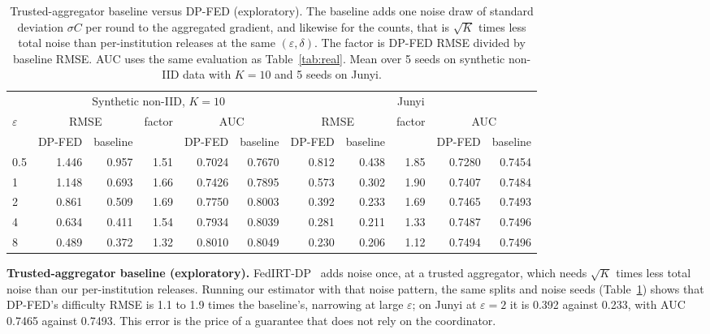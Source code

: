 \documentclass[pdflatex,iicol,sn-mathphys-num]{sn-jnl}
\theoremstyle{thmstyleone}
\newenvironment{widetable}{\begin{table}[t]}{\end{table}}
\newcommand{\ExJunyiFedTwoAuc}{0.7465}
\newcommand{\ExJunyiFedTwoRmse}{0.392}
\newcommand{\ExJunyiSecTwoAuc}{0.7493}
\newcommand{\ExJunyiSecTwoRmse}{0.233}
\newcommand{\ExRatioMax}{1.9}
\newcommand{\ExRatioMin}{1.1}
\newcommand{\ExSeedsJunyi}{5}
\newcommand{\NSeeds}{5}
\begin{document}
\begin{widetable}
\centering
\caption{Trusted-aggregator baseline versus DP-FED (exploratory). The baseline adds one noise draw of standard deviation $\sigma C$ per round to the aggregated gradient, and likewise for the counts, that is $\sqrt{K}$ times less total noise than per-institution releases at the same $(\varepsilon,\delta)$. The factor is DP-FED RMSE divided by baseline RMSE. AUC uses the same evaluation as Table~\ref{tab:real}. Mean over \NSeeds{} seeds on synthetic non-IID data with $K=10$ and \ExSeedsJunyi{} seeds on Junyi.}
\label{tab:fedirtdp}
\footnotesize\setlength{\tabcolsep}{4pt}
\begin{tabular}{l rrr rr rrr rr}
\toprule
& \multicolumn{5}{c}{Synthetic non-IID, $K=10$} & \multicolumn{5}{c}{Junyi} \\
\cmidrule(lr){2-6}\cmidrule(lr){7-11}
$\varepsilon$ & \multicolumn{2}{c}{RMSE} & factor & \multicolumn{2}{c}{AUC} & \multicolumn{2}{c}{RMSE} & factor & \multicolumn{2}{c}{AUC} \\
& DP-FED & baseline & & DP-FED & baseline & DP-FED & baseline & & DP-FED & baseline \\
\midrule
0.5 & 1.446 & 0.957 & 1.51 & 0.7024 & 0.7670 & 0.812 & 0.438 & 1.85 & 0.7280 & 0.7454 \\
1 & 1.148 & 0.693 & 1.66 & 0.7426 & 0.7895 & 0.573 & 0.302 & 1.90 & 0.7407 & 0.7484 \\
2 & 0.861 & 0.509 & 1.69 & 0.7750 & 0.8003 & 0.392 & 0.233 & 1.69 & 0.7465 & 0.7493 \\
4 & 0.634 & 0.411 & 1.54 & 0.7934 & 0.8039 & 0.281 & 0.211 & 1.33 & 0.7487 & 0.7496 \\
8 & 0.489 & 0.372 & 1.32 & 0.8010 & 0.8049 & 0.230 & 0.206 & 1.12 & 0.7494 & 0.7496 \\
\bottomrule
\end{tabular}
\end{widetable}

\textbf{Trusted-aggregator baseline (exploratory).} FedIRT-DP~\cite{zhou2025federated} adds noise once, at a trusted aggregator, which needs $\sqrt{K}$ times less total noise than our per-institution releases. Running our estimator with that noise pattern, the same splits and noise seeds (Table~\ref{tab:fedirtdp}) shows that DP-FED's difficulty RMSE is \ExRatioMin{} to \ExRatioMax{} times the baseline's, narrowing at large $\varepsilon$; on Junyi at $\varepsilon=2$ it is \ExJunyiFedTwoRmse{} against \ExJunyiSecTwoRmse{}, with AUC \ExJunyiFedTwoAuc{} against \ExJunyiSecTwoAuc{}. This error is the price of a guarantee that does not rely on the coordinator.
\end{document}
